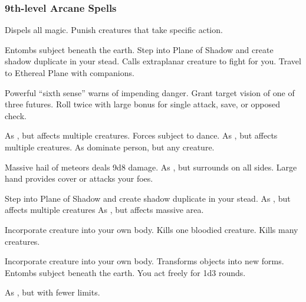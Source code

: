 \subsubsection{9th-level Arcane Spells} 
\begin{swspelllist}
     Dispels all magic.
   Punish creatures that take specific action.

   Entombs subject beneath the earth.
   Step into Plane of Shadow and create shadow duplicate in your stead.
   Calls extraplanar creature to fight for you.
   Travel to Ethereal Plane with companions.

   Powerful ``sixth sense'' warns of impending danger.
   Grant target vision of one of three futures.
   Roll twice with large bonus for single attack, save, or opposed check.

   As , but affects multiple creatures.
   Forces subject to dance.
   As , but affects multiple creatures.
   As dominate person, but any creature.

   Massive hail of meteors deals 9d8 damage.
   As , but surrounds on all sides.
   Large hand provides cover or attacks your foes.

   Step into Plane of Shadow and create shadow duplicate in your stead.
   As , but affects multiple creatures
   As , but affects massive area.

   Incorporate creature into your own body.
   Kills one bloodied creature.
   Kills many creatures.

   Incorporate creature into your own body.
   Transforms objects into new forms.
   Entombs subject beneath the earth.
   You act freely for 1d3 rounds.

  \M As , but with fewer limits.
\end{swspelllist}

